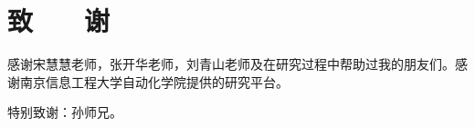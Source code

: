 ﻿\chapter*{\hfill 致　　谢 \hfill}

感谢宋慧慧老师，张开华老师，刘青山老师及在研究过程中帮助过我的朋友们。感谢南京信息工程大学自动化学院提供的研究平台。

特别致谢：孙师兄。

